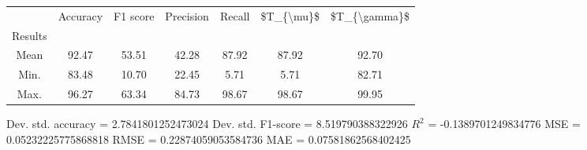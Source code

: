 \begin{tabular}{|c|c|c|c|c|c|c|}
\toprule
{} &  Accuracy &  F1 score &  Precision &  Recall &  \$T\_\{\textbackslash mu\}\$ &  \$T\_\{\textbackslash gamma\}\$ \\
Results &           &           &            &         &            &               \\
\hline
Mean    &     92.47 &     53.51 &      42.28 &   87.92 &      87.92 &         92.70 \\
Min.    &     83.48 &     10.70 &      22.45 &    5.71 &       5.71 &         82.71 \\
Max.    &     96.27 &     63.34 &      84.73 &   98.67 &      98.67 &         99.95 \\
\bottomrule
\end{tabular}

 Dev. std. accuracy = 2.7841801252473024
 Dev. std. F1-score = 8.519790388322926
 $R^2$ = -0.1389701249834776
 MSE = 0.05232225775868818
 RMSE = 0.22874059053584736
 MAE = 0.07581862568402425